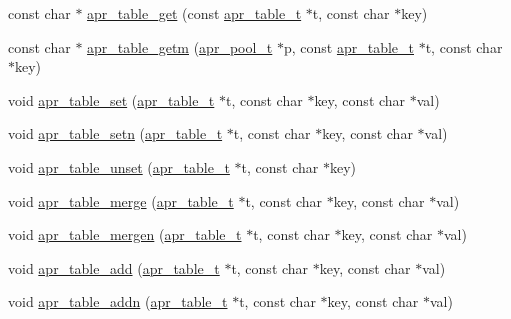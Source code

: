 \begin{DoxyCompactItemize}
\item 
const char $\ast$ \hyperlink{group__apr__tables_ga4db13e3915c6b9a3142b175d4c15d915}{apr\+\_\+table\+\_\+get} (const \hyperlink{group__apr__tables_gad7ea82d6608a4a633fc3775694ab71e4}{apr\+\_\+table\+\_\+t} $\ast$t, const char $\ast$key)
\item 
const char $\ast$ \hyperlink{group__apr__tables_gaa52177e485731ec599d04f863872c5f3}{apr\+\_\+table\+\_\+getm} (\hyperlink{group__apr__pools_gaf137f28edcf9a086cd6bc36c20d7cdfb}{apr\+\_\+pool\+\_\+t} $\ast$p, const \hyperlink{group__apr__tables_gad7ea82d6608a4a633fc3775694ab71e4}{apr\+\_\+table\+\_\+t} $\ast$t, const char $\ast$key)
\item 
void \hyperlink{group__apr__tables_gaf101d92c2f6343cdf4ec062ff416f244}{apr\+\_\+table\+\_\+set} (\hyperlink{group__apr__tables_gad7ea82d6608a4a633fc3775694ab71e4}{apr\+\_\+table\+\_\+t} $\ast$t, const char $\ast$key, const char $\ast$val)
\item 
void \hyperlink{group__apr__tables_ga1fe7bb25d4027bb79d3c2bb41d8d8b75}{apr\+\_\+table\+\_\+setn} (\hyperlink{group__apr__tables_gad7ea82d6608a4a633fc3775694ab71e4}{apr\+\_\+table\+\_\+t} $\ast$t, const char $\ast$key, const char $\ast$val)
\item 
void \hyperlink{group__apr__tables_gab0df7a237feb4cd9beed201f4e236127}{apr\+\_\+table\+\_\+unset} (\hyperlink{group__apr__tables_gad7ea82d6608a4a633fc3775694ab71e4}{apr\+\_\+table\+\_\+t} $\ast$t, const char $\ast$key)
\item 
void \hyperlink{group__apr__tables_gad5d10eca30b76fb44d999b4dfda8d632}{apr\+\_\+table\+\_\+merge} (\hyperlink{group__apr__tables_gad7ea82d6608a4a633fc3775694ab71e4}{apr\+\_\+table\+\_\+t} $\ast$t, const char $\ast$key, const char $\ast$val)
\item 
void \hyperlink{group__apr__tables_ga1d50805448114c476cfcd00d5ee3e3a8}{apr\+\_\+table\+\_\+mergen} (\hyperlink{group__apr__tables_gad7ea82d6608a4a633fc3775694ab71e4}{apr\+\_\+table\+\_\+t} $\ast$t, const char $\ast$key, const char $\ast$val)
\item 
void \hyperlink{group__apr__tables_gab2ea874754a0fbf139b7316c1f837f12}{apr\+\_\+table\+\_\+add} (\hyperlink{group__apr__tables_gad7ea82d6608a4a633fc3775694ab71e4}{apr\+\_\+table\+\_\+t} $\ast$t, const char $\ast$key, const char $\ast$val)
\item 
void \hyperlink{group__apr__tables_gaff9fdbd8f499f0dfb07123230e19ea54}{apr\+\_\+table\+\_\+addn} (\hyperlink{group__apr__tables_gad7ea82d6608a4a633fc3775694ab71e4}{apr\+\_\+table\+\_\+t} $\ast$t, const char $\ast$key, const char $\ast$val)

\end{DoxyCompactItemize}
